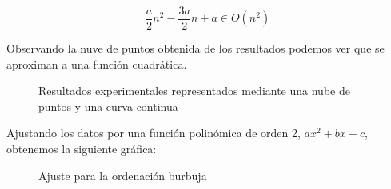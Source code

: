 \documentclass{article}
\begin{document}
$$ \frac{a}{2}n^2 - \frac{3a}{2}n + a \in O(n^2)$$

Observando la nuve de puntos obtenida de los resultados podemos ver
que se aproximan a una función cuadrática.

\begin{figure}[H]%
    \centering
    \qquad
    \caption{Resultados experimentales representados mediante una nube de puntos y una curva continua}%
    \label{fig:example}%
  \end{figure}

Ajustando los datos por una función polinómica de orden 2, $ax^2+bx + c$, obtenemos la siguiente gráfica:

\begin{figure}[H]%
    \centering
    \caption{Ajuste para la ordenación burbuja}%
    \label{fig:example}%
  \end{figure}
\end{document}

